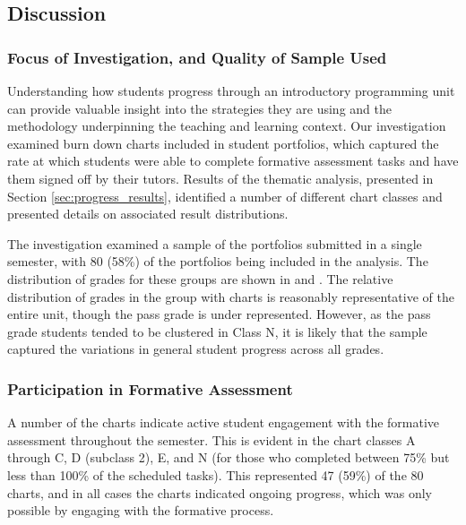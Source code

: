 



\subsection{Discussion} %
\label{sec:progress_discussion}

\subsubsection{Focus of Investigation, and Quality of Sample Used} %
\label{sub:focus_of_investigation_and_quality_of_sample_used}

Understanding how students progress through an introductory programming unit can provide valuable insight into the strategies they are using and the methodology underpinning the teaching and learning context. Our investigation examined burn down charts included in student portfolios, which captured the rate at which students were able to complete formative assessment tasks and have them signed off by their tutors.  Results of the thematic analysis, presented in Section \ref{sec:progress_results}, identified a number of different chart classes and presented details on associated result distributions.

The investigation examined a sample of the portfolios submitted in a single semester, with 80 (58\%) of the portfolios being included in the analysis. The distribution of grades for these groups are shown in  and . The relative distribution of grades in the group with charts is reasonably representative of the entire unit, though the pass grade is under represented. However, as the pass grade students tended to be clustered in Class N, it is likely that the sample captured the variations in general student progress across all grades.


\subsubsection{Participation in Formative Assessment} %
\label{sub:participation_in_formative_assessment}

A number of the charts indicate active student engagement with the formative assessment throughout the semester. This is evident in the chart classes A through C, D (subclass 2), E, and N (for those who completed between 75\% but less than 100\% of the scheduled tasks). This represented 47 (59\%) of the 80 charts, and in all cases the charts indicated ongoing progress, which was only possible by engaging with the formative process. 

